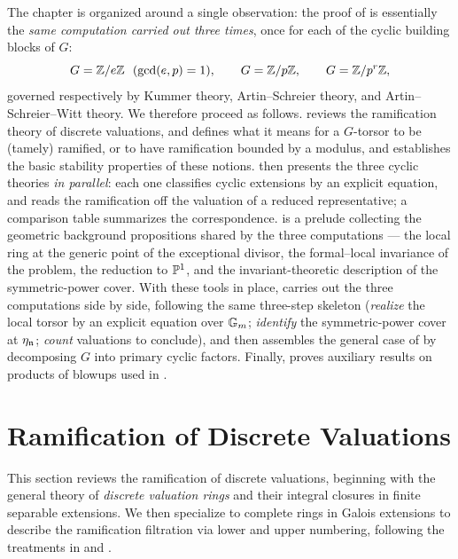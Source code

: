 The chapter is organized around a single observation: the proof of
 is essentially the \emph{same
computation carried out three times}, once for each of the cyclic building
blocks of $G$:
\[
    G = \mathbb{Z}/e\mathbb{Z} \ \ (\gcd(e,p)=1), \qquad
    G = \mathbb{Z}/p\mathbb{Z}, \qquad
    G = \mathbb{Z}/p^r\mathbb{Z},
\]
governed respectively by Kummer theory, Artin--Schreier theory, and
Artin--Schreier--Witt theory. We therefore proceed as follows.
 reviews the ramification
theory of discrete valuations, and
 defines what it means for a $G$-torsor
to be (tamely) ramified, or to have ramification bounded by a modulus, and
establishes the basic stability properties of these notions.
 then presents the three cyclic
theories \emph{in parallel}: each one classifies cyclic extensions by an
explicit equation, and reads the ramification off the valuation of a reduced
representative; a comparison table summarizes the correspondence.
 is a prelude collecting the geometric
background propositions shared by the three computations --- the local ring at
the generic point of the exceptional divisor, the formal--local invariance of
the problem, the reduction to $\mathbb{P}^1$, and the invariant-theoretic
description of the symmetric-power cover. With these tools in place,
 carries out the three
computations side by side, following the same three-step skeleton
(\emph{realize} the local torsor by an explicit equation over $\mathbb{G}_m$;
\emph{identify} the symmetric-power cover at $\eta_{\mathfrak{n}}$; \emph{count}
valuations to conclude), and then assembles the general case of
 by decomposing $G$ into primary
cyclic factors. Finally,  proves auxiliary
results on products of blowups used in .


\section{Ramification of Discrete Valuations}\label{section:ramification_of_discrete_valuations}
This section reviews the ramification of discrete valuations, beginning with the general theory of \textit{discrete valuation rings} and their
integral closures in finite separable extensions.
We then specialize to complete rings in Galois extensions to describe the ramification filtration via lower and upper numbering,
following the treatments in  and \cite{serreLF}.

